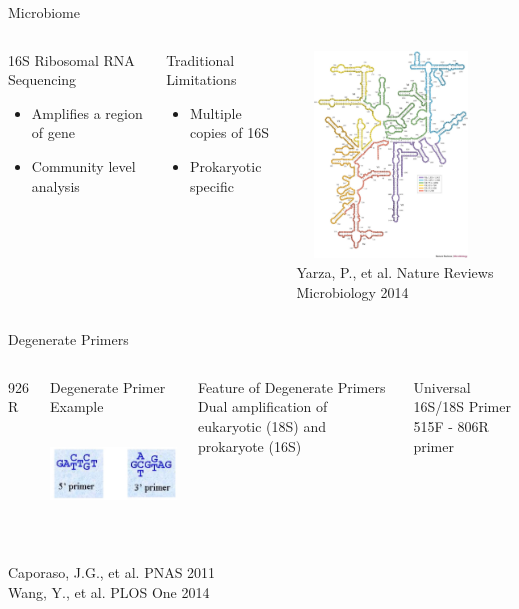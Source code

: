 \documentclass[11pt, xcolor=table]{beamer}
\begin{document}
	
	\begin{frame}{Microbiome}
	\begin{columns}
	\begin{block}{16S Ribosomal RNA Sequencing}
	\begin{itemize}
		\item Amplifies a region of gene
		\item Community level analysis 
	\end{itemize}
	\end{block}
		
		
	\begin{block}{Traditional Limitations}
	\begin{itemize}
		\item Multiple copies of 16S
		\item \alert{Prokaryotic specific}
	\end{itemize}
	\end{block}
	
	\includegraphics[height=5.5cm, width=5cm]{ribosome.jpg} \\
	\tiny{Yarza, P., et al. Nature Reviews Microbiology 2014}
	\end{columns}

	
	
	\end{frame}
	\begin{frame}{Degenerate Primers}
	\begin{columns}
	926 R
	
	\column{0.5\textwidth}
	\begin{block}{Degenerate Primer Example}
	\includegraphics[height=3cm, width=5cm]{CPBS_11_18/primers.jpg}
	\end{block}
	\column{0.5\textwidth}
	\begin{block}{Feature of Degenerate Primers}
	Dual amplification of eukaryotic (18S) and prokaryote (16S)
	\end{block}
	\begin{block}{Universal 16S/18S Primer}
	515F - 806R primer
	\end{block}
	\end{columns}
	\tiny{Caporaso, J.G., et al. PNAS 2011 \\ Wang, Y., et al. PLOS One 2014}

	\end{frame}
\end{document}
